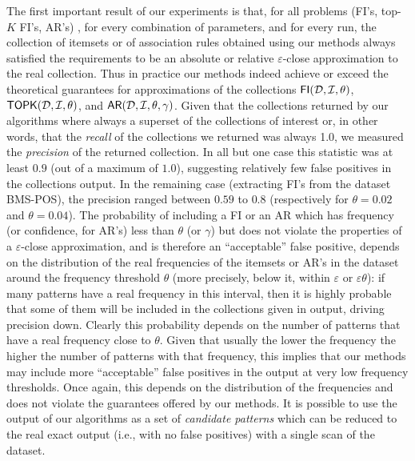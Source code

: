 The first important result of our experiments is that, for all problems (FI's,
top-$K$ FI's, AR's) , for every combination of parameters, and for every run, the
collection of itemsets or of association rules obtained using our methods always
satisfied the requirements to be an absolute or relative $\varepsilon$-close
approximation to the real collection. Thus in practice our methods indeed
achieve or exceed the theoretical guarantees for approximations of the
collections $\mathsf{FI}({\cal D},{\cal I},\theta)$, $\mathsf{TOPK}({\cal D},{\cal I},\theta)$, and
$\mathsf{AR}({\cal D},{\cal I},\theta,\gamma)$.  
Given that the collections returned by our algorithms where always a superset of
the collections of interest or, in other words, that the \emph{recall} of the
collections we returned was always 1.0, we measured the \emph{precision} of the
returned collection. In all but one case this statistic was at least $0.9$ (out
of a maximum of $1.0$), suggesting relatively few false positives in the
collections output. In the remaining case (extracting FI's from the dataset
BMS-POS), the precision ranged between $0.59$ to $0.8$ (respectively for
$\theta=0.02$ and $\theta=0.04$). The
probability of including a FI or an AR which has frequency (or confidence, for
AR's) less than $\theta$ (or $\gamma$) but does not violate the properties of a
$\varepsilon$-close approximation,  and is therefore an
``acceptable'' false positive, depends on the distribution of the
real frequencies of the itemsets or AR's in the dataset around the frequency
threshold $\theta$ (more precisely, below it, within $\varepsilon$ or
$\varepsilon\theta$): if many patterns have a real frequency in this interval,
then it is highly probable that some of them will be included in the collections
given in output, driving precision down. Clearly this probability depends on the
number of patterns that have a real frequency close to $\theta$. Given that
usually the lower the frequency the higher the number of patterns with that
frequency, this implies that our methods may include more ``acceptable'' false
positives in the output at very low frequency thresholds. Once again, this
depends on the distribution of the frequencies and does not violate the
guarantees offered by our methods. It is possible to use the output of our
algorithms as a set of \emph{candidate patterns} which can be reduced to the
real exact output (i.e., with no false positives) with a single scan of the
dataset.

